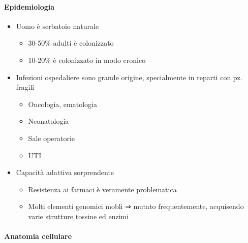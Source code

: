 \documentclass[italian,]{article}
\providecommand{\tightlist}{%
  \setlength{\itemsep}{0pt}\setlength{\parskip}{0pt}}
\begin{document}
\hypertarget{epidemiologia}{%
\paragraph{Epidemiologia}\label{epidemiologia}}

\begin{itemize}
\tightlist
\item
  Uomo è serbatoio naturale

  \begin{itemize}
  \tightlist
  \item
    30-50\% adulti è colonizzato
  \item
    10-20\% è colonizzato in modo cronico
  \end{itemize}
\item
  Infezioni ospedaliere sono grande origine, specialmente in reparti con
  pz. fragili

  \begin{itemize}
  \tightlist
  \item
    Oncologia, ematologia
  \item
    Neonatologia
  \item
    Sale operatorie
  \item
    UTI
  \end{itemize}
\item
  Capacità adattiva sorprendente

  \begin{itemize}
  \tightlist
  \item
    Resistenza ai farmaci è veramente problematica
  \item
    Molti elementi genomici mobli ⇒ mutato frequentemente, acquisendo
    varie strutture tossine ed enzimi
  \end{itemize}
\end{itemize}

\hypertarget{anatomia-cellulare}{%
\paragraph{Anatomia cellulare}\label{anatomia-cellulare}}
\end{document}
